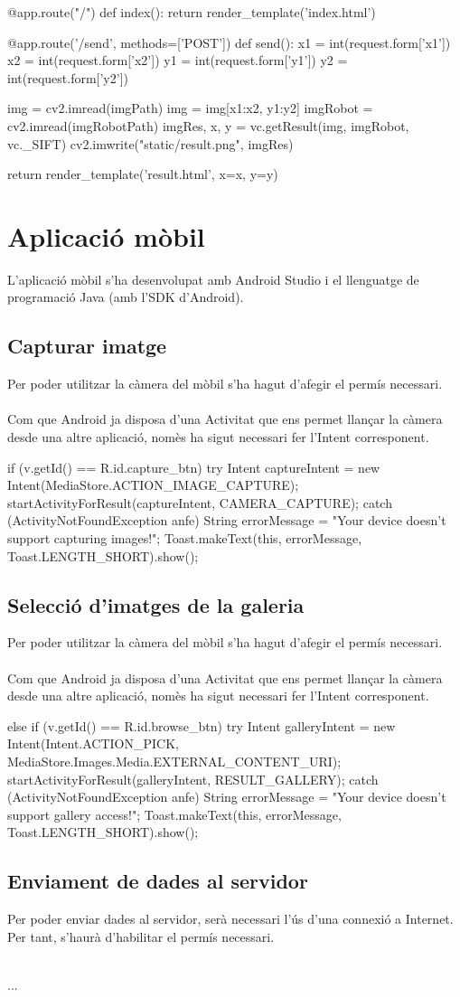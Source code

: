 		\begin{python}
@app.route("/")
def index():
	return render_template('index.html')

@app.route('/send', methods=['POST'])
def send():
	x1 = int(request.form['x1'])
	x2 = int(request.form['x2'])
	y1 = int(request.form['y1'])
	y2 = int(request.form['y2'])

	img = cv2.imread(imgPath)
	img = img[x1:x2, y1:y2]
	imgRobot = cv2.imread(imgRobotPath)
	imgRes, x, y = vc.getResult(img, imgRobot, vc._SIFT)
	cv2.imwrite("static/result.png", imgRes)

	return render_template('result.html', x=x, y=y)
		\end{python}


\section{Aplicació mòbil}
	L'aplicació mòbil s'ha desenvolupat amb Android Studio i el llenguatge de programació Java (amb l'SDK d'Android).
	\subsection{Capturar imatge}
		Per poder utilitzar la càmera del mòbil s'ha hagut d'afegir el permís necessari.\\\\
		Com que Android ja disposa d'una Activitat que ens permet llançar la càmera desde una altre aplicació, nomès ha sigut necessari fer l'Intent corresponent.\\
		\begin{java}
if (v.getId() == R.id.capture_btn) try {
	Intent captureIntent = new Intent(MediaStore.ACTION_IMAGE_CAPTURE);
	startActivityForResult(captureIntent, CAMERA_CAPTURE);
} catch (ActivityNotFoundException anfe) {
	String errorMessage = "Your device doesn't support capturing images!";
	Toast.makeText(this, errorMessage, Toast.LENGTH_SHORT).show();
}
		\end{java}
	\subsection{Selecció d'imatges de la galeria}
		Per poder utilitzar la càmera del mòbil s'ha hagut d'afegir el permís necessari.\\\\
		Com que Android ja disposa d'una Activitat que ens permet llançar la càmera desde una altre aplicació, nomès ha sigut necessari fer l'Intent corresponent.\\
		\begin{java}
else if (v.getId() == R.id.browse_btn) try {
	Intent galleryIntent = new Intent(Intent.ACTION_PICK, MediaStore.Images.Media.EXTERNAL_CONTENT_URI);
	startActivityForResult(galleryIntent, RESULT_GALLERY);
} catch (ActivityNotFoundException anfe) {
	String errorMessage = "Your device doesn't support gallery access!";
	Toast.makeText(this, errorMessage, Toast.LENGTH_SHORT).show();
}
		\end{java}
	\subsection{Enviament de dades al servidor}
		Per poder enviar dades al servidor, serà necessari l'ús d'una connexió a Internet. Per tant, s'haurà d'habilitar el permís necessari.\\\\
		\begin{java}
...
		\end{java}
